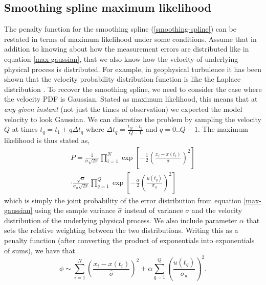 \documentclass[10pt,journal]{IEEEtran}
\begin{document}
\subsection{Smoothing spline maximum likelihood}
\label{sec:maximum_lielihood}

The penalty function for the smoothing spline (\ref{smoothing-spline}) can be restated in terms of maximum likelihood under some conditions. Assume that in addition to knowing about how the measurement errors are distributed like in equation \ref{max-gaussian}, that we also know how the velocity of underlying physical process is distributed. For example, in geophysical turbulence it has been shown that the velocity probability distribution function is like the Laplace distribution \cite{bracco2000-pf}. To recover the smoothing spline, we need to consider the case where the velocity PDF is Gaussian. Stated as maximum likelihood, this means that at \emph{any given instant} (not just the times of observation) we expected the model velocity to look Gaussian. We can discretize the problem by sampling the velocity $Q$ at times $t_q = t_1 + q \Delta t_q$ where $\Delta t_q=\frac{t_N-t_1}{Q-1}$ and $q=0..Q-1$. The maximum likelihood is thus stated as,
\begin{equation}
\label{gaussian-max-likelihood}
\begin{split}
P =  \frac{1}{\hat{\sigma} \sqrt{2 \pi}} \prod^N _{i=1}\exp \left[ -\frac{1}{2} \left( \frac{x_i - x(t_i)}{\hat{\sigma}} \right)^2 \right] \\\cdot \frac{\sqrt{\alpha}}{\sigma_u \sqrt{2 \pi}} \prod^{Q}_{q=1} \exp \left[  - \frac{\alpha}{2} \left(  \frac{u(t_q)}{\sigma_u} \right)^2 \right]
\end{split}
\end{equation}
which is simply the joint probability of the error distribution from equation \ref{max-gaussian} using the sample variance $\hat{\sigma}$ instead of variance $\sigma$ and the velocity distribution of the underlying physical process. We also include parameter $\alpha$ that sets the relative weighting between the two distributions. Writing this as a penalty function (after converting the product of exponentials into exponentials of sums), we have that
\begin{equation}
\label{smoothing-spline-log-likelihood}
\phi \sim  \sum^N _{i=1}  \left( \frac{x_i - x(t_i)}{\hat{\sigma}} \right)^2 + \alpha \sum^{Q}_{q=1} \left( \frac{u(t_q)}{\sigma_u} \right)^2.
\end{equation}
\end{document}
